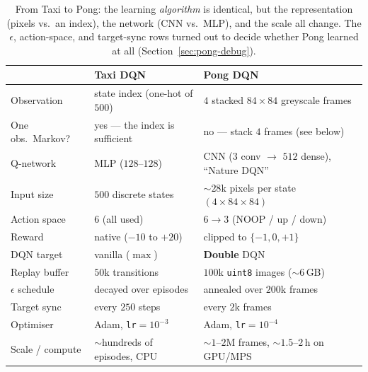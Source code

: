 \documentclass[11pt]{article}
\begin{document}
\begin{table}[h]
\centering
\small
\begin{tabular}{@{}l p{4.4cm} p{5.8cm}@{}}
\toprule
 & \textbf{Taxi DQN} & \textbf{Pong DQN} \\
\midrule
Observation         & state index (one-hot of $500$)      & $4$ stacked $84\times84$ greyscale frames \\
One obs.\ Markov?   & yes --- the index is sufficient     & no --- stack $4$ frames (see below) \\
Q-network           & MLP ($128$--$128$)                  & CNN (3 conv $\to$ $512$ dense), ``Nature DQN'' \\
Input size          & $500$ discrete states               & ${\sim}28$k pixels per state $(4{\times}84{\times}84)$ \\
Action space        & $6$ (all used)                      & $6\to3$ (NOOP / up / down) \\
Reward              & native ($-10$ to $+20$)             & clipped to $\{-1,0,+1\}$ \\
DQN target          & vanilla ($\max$)                    & \textbf{Double} DQN \\
Replay buffer       & $50$k transitions                   & $100$k \texttt{uint8} images (${\sim}6$\,GB) \\
$\epsilon$ schedule & decayed over episodes               & annealed over $200$k frames \\
Target sync         & every $250$ steps                   & every $2$k frames \\
Optimiser           & Adam, \texttt{lr}$=10^{-3}$         & Adam, \texttt{lr}$=10^{-4}$ \\
Scale / compute     & ${\sim}$hundreds of episodes, CPU   & ${\sim}1$--$2$M frames, ${\sim}1.5$--$2$\,h on GPU/MPS \\
\bottomrule
\end{tabular}
\caption{From Taxi to Pong: the learning \emph{algorithm} is identical, but the representation
(pixels vs.\ an index), the network (CNN vs.\ MLP), and the scale all change. The $\epsilon$,
action-space, and target-sync rows turned out to decide whether Pong learned at all
(Section~\ref{sec:pong-debug}).}
\label{tab:taxi-vs-pong}
\end{table}
\end{document}
